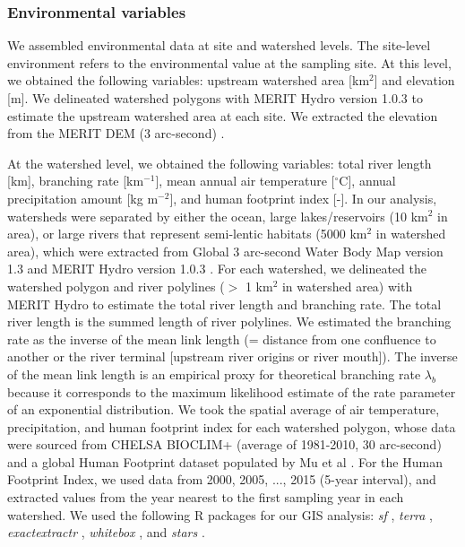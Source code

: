 \documentclass[11pt, class=article, crop=false]{standalone}
\begin{document}
\subsubsection{Environmental variables}

We assembled environmental data at site and watershed levels.
The site-level environment refers to the environmental value at the sampling site.
At this level, we obtained the following variables: upstream watershed area [km$^2$] and elevation [m].
We delineated watershed polygons with MERIT Hydro version 1.0.3 \citep{yamazaki_merit_2019} to estimate the upstream watershed area at each site.
We extracted the elevation from the MERIT DEM (3 arc-second) \citep{yamazaki_high-accuracy_2017}.

At the watershed level, we obtained the following variables: total river length [km], branching rate [km$^{-1}$], mean annual air temperature [$^\circ$C], annual precipitation amount [kg m$^{-2}$], and human footprint index [-].
In our analysis, watersheds were separated by either the ocean, large lakes/reservoirs (10 km$^{2}$ in area), or large rivers that represent semi-lentic habitats (5000 km$^{2}$ in watershed area), which were extracted from Global 3 arc-second Water Body Map version 1.3 \citep{yamazaki_development_2015} and MERIT Hydro version 1.0.3 \citep{yamazaki_merit_2019}.
For each watershed, we delineated the watershed polygon and river polylines ($>$ 1 km$^2$ in watershed area) with MERIT Hydro to estimate the total river length and branching rate.
The total river length is the summed length of river polylines.
We estimated the branching rate as the inverse of the mean link length (= distance from one confluence to another or the river terminal [upstream river origins or river mouth]).
The inverse of the mean link length is an empirical proxy for theoretical branching rate $\lambda_b$ because it corresponds to the maximum likelihood estimate of the rate parameter of an exponential distribution.
We took the spatial average of air temperature, precipitation, and human footprint index for each watershed polygon, whose data were sourced from CHELSA BIOCLIM+ (average of 1981-2010, 30 arc-second) \citep{brun_global_2022} and a global Human Footprint dataset populated by Mu et al \citep{mu_global_2022}.
For the Human Footprint Index, we used data from 2000, 2005, ..., 2015 (5-year interval), and extracted values from the year nearest to the first sampling year in each watershed.
We used the following R packages for our GIS analysis: \textit{sf} \citep{pkg_sf}, \textit{terra} \citep{pkg_terra}, \textit{exactextractr} \citep{pkg_exactextractr}, \textit{whitebox} \citep{pkg_whitebox}, and \textit{stars} \citep{pkg_stars}.
\end{document}
